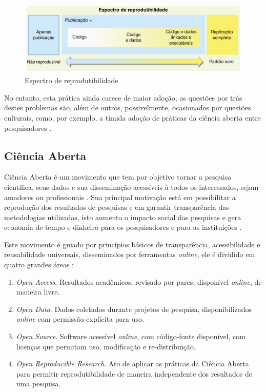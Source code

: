 \begin{figure}[h]
  \center
  \includegraphics[scale=0.3]{imagens/reproducibility-spectrum-ptbr.png}
  \caption{Espectro de reprodutibilidade \cite{peng2011reproducible}}
  \label{reproducibility-spectrum}
\end{figure}

No entanto, esta prática ainda carece de maior adoção, as questões por trás
destes problemas são, além de outros, possivelmente, ocasionados por questões
culturais, como, por exemplo, a tímida adoção de práticas da ciência aberta
entre pesquisadores \cite{niemeyer2017open}.

\subsection{Ciência Aberta}

Ciência Aberta é um movimento que tem por objetivo tornar a pesquisa
científica, seus dados e sua disseminação acessíveis à todos os interessados,
sejam amadores ou profissionais \cite{WikipediaOpenScience}. Sua principal
motivação está em possibilitar a reprodução dos resultados de pesquisas e em
garantir transparência das metodologias utilizadas, isto aumenta o impacto
social das pesquisas e gera economia de tempo e dinheiro para os pesquisadores
e para as instituições \cite{nesta2010open}.

Este movimento é guiado por princípios básicos de transparência, acessibilidade
e reusabilidade universais, disseminados por ferramentas {\it online}, ele é
dividido em quatro grandes áreas \cite{pontika_fostering_2015}:

\begin{enumerate}
  \item {\it Open Access}.
    Resultados acadêmicos, revisado por pares, disponível {\it online}, de
    maneira livre.

  \item {\it Open Data}.
    Dados coletados durante projetos de pesquisa, disponibilizados {\it
    online} com permissão explícita para uso.

  \item {\it Open Source}.
    Software acessível {\it online}, com código-fonte disponível, com licenças
    que permitam uso, modificação e re-distribuição.

  \item {\it Open Reproducible Research}.
    Ato de aplicar as práticas da Ciência Aberta para permitir reprodutibilidade
    de maneira independente dos resultados de uma pesquisa.
\end{enumerate}

